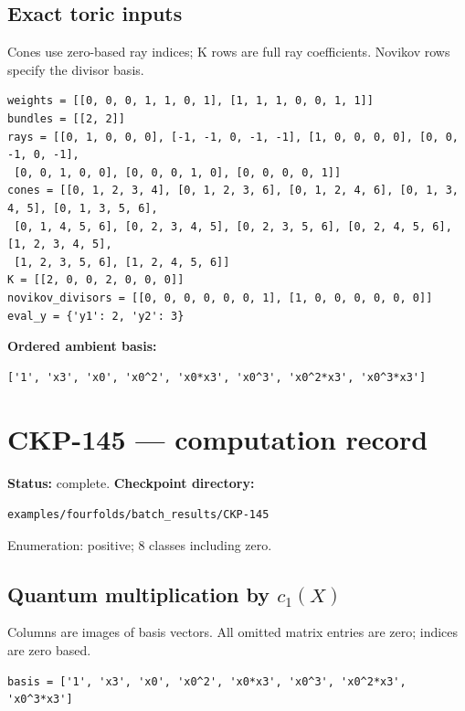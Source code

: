 \documentclass[10pt,a4paper]{article}
\begin{document}
\subsection*{Exact toric inputs}
Cones use zero-based ray indices; K rows are full ray coefficients. Novikov rows specify the divisor basis.

\begin{lstlisting}
weights = [[0, 0, 0, 1, 1, 0, 1], [1, 1, 1, 0, 0, 1, 1]]
bundles = [[2, 2]]
rays = [[0, 1, 0, 0, 0], [-1, -1, 0, -1, -1], [1, 0, 0, 0, 0], [0, 0, -1, 0, -1],
 [0, 0, 1, 0, 0], [0, 0, 0, 1, 0], [0, 0, 0, 0, 1]]
cones = [[0, 1, 2, 3, 4], [0, 1, 2, 3, 6], [0, 1, 2, 4, 6], [0, 1, 3, 4, 5], [0, 1, 3, 5, 6],
 [0, 1, 4, 5, 6], [0, 2, 3, 4, 5], [0, 2, 3, 5, 6], [0, 2, 4, 5, 6], [1, 2, 3, 4, 5],
 [1, 2, 3, 5, 6], [1, 2, 4, 5, 6]]
K = [[2, 0, 0, 2, 0, 0, 0]]
novikov_divisors = [[0, 0, 0, 0, 0, 0, 1], [1, 0, 0, 0, 0, 0, 0]]
eval_y = {'y1': 2, 'y2': 3}
\end{lstlisting}

\textbf{Ordered ambient basis:}
\begin{lstlisting}
['1', 'x3', 'x0', 'x0^2', 'x0*x3', 'x0^3', 'x0^2*x3', 'x0^3*x3']
\end{lstlisting}

\clearpage\section*{CKP-145 --- computation record}
\textbf{Status:} complete.
\textbf{Checkpoint directory:}
\begin{lstlisting}
examples/fourfolds/batch_results/CKP-145
\end{lstlisting}

Enumeration: positive; 8 classes including zero.
\subsection*{Quantum multiplication by $c_1(X)$}
Columns are images of basis vectors. All omitted matrix entries are zero; indices are zero based.

\begin{lstlisting}
basis = ['1', 'x3', 'x0', 'x0^2', 'x0*x3', 'x0^3', 'x0^2*x3', 'x0^3*x3']
\end{lstlisting}
\end{document}
